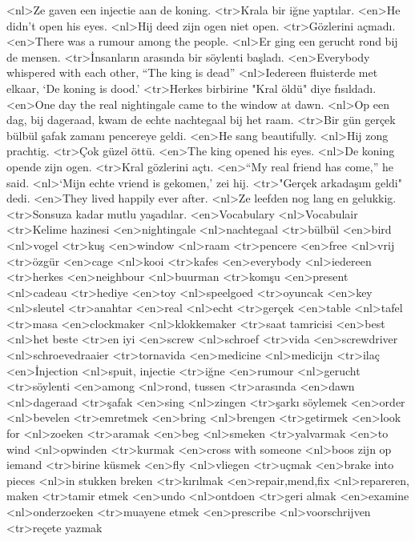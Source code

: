 <nl>Ze gaven een injectie aan de koning.
<tr>Krala bir iğne yaptılar.
<en>He didn’t open his eyes.
<nl>Hij deed zijn ogen niet open.
<tr>Gözlerini açmadı.
<en>There was a rumour among the people.
<nl>Er ging een gerucht rond bij de mensen.
<tr>İnsanların arasında bir söylenti başladı.
<en>Everybody whispered with each other, “The king is dead”
<nl>Iedereen fluisterde met elkaar, `De koning is dood.'
<tr>Herkes birbirine "Kral öldü" diye fısıldadı.
<en>One day the real nightingale came to the window at dawn.
<nl>Op een dag, bij dageraad,  kwam de echte nachtegaal bij het raam.
<tr>Bir gün gerçek bülbül şafak zamanı pencereye geldi.
<en>He sang beautifully.
<nl>Hij zong prachtig.
<tr>Çok güzel öttü.
<en>The king opened his eyes.
<nl>De koning opende zijn ogen.
<tr>Kral gözlerini açtı.
<en>“My real friend has  come,” he said.
<nl>`Mijn echte vriend is gekomen,' zei hij.
<tr>"Gerçek arkadaşım geldi" dedi.
<en>They lived happily ever after.
<nl>Ze leefden nog lang en gelukkig.
<tr>Sonsuza kadar mutlu yaşadılar.
<en>Vocabulary
<nl>Vocabulair
<tr>Kelime hazinesi
<en>nightingale
<nl>nachtegaal
<tr>bülbül
<en>bird
<nl>vogel
<tr>kuş
<en>window
<nl>raam
<tr>pencere
<en>free
<nl>vrij
<tr>özgür
<en>cage
<nl>kooi
<tr>kafes
<en>everybody
<nl>iedereen
<tr>herkes
<en>neighbour
<nl>buurman
<tr>komşu
<en>present
<nl>cadeau
<tr>hediye
<en>toy
<nl>speelgoed
<tr>oyuncak
<en>key
<nl>sleutel
<tr>anahtar
<en>real
<nl>echt
<tr>gerçek
<en>table
<nl>tafel
<tr>masa
<en>clockmaker
<nl>klokkemaker
<tr>saat tamricisi
<en>best
<nl>het beste
<tr>en iyi
<en>screw
<nl>schroef
<tr>vida
<en>screwdriver
<nl>schroevedraaier
<tr>tornavida
<en>medicine
<nl>medicijn
<tr>ilaç
<en>İnjection
<nl>spuit, injectie
<tr>iğne
<en>rumour
<nl>gerucht
<tr>söylenti
<en>among
<nl>rond, tussen
<tr>arasında
<en>dawn
<nl>dageraad
<tr>şafak
<en>sing
<nl>zingen
<tr>şarkı söylemek
<en>order
<nl>bevelen
<tr>emretmek
<en>bring
<nl>brengen
<tr>getirmek
<en>look for
<nl>zoeken
<tr>aramak
<en>beg
<nl>smeken
<tr>yalvarmak
<en>to wind
<nl>opwinden
<tr>kurmak
<en>cross with someone
<nl>boos zijn op iemand
<tr>birine küsmek
<en>fly
<nl>vliegen
<tr>uçmak
<en>brake into pieces
<nl>in stukken breken
<tr>kırılmak
<en>repair,mend,fix
<nl>repareren, maken
<tr>tamir etmek
<en>undo
<nl>ontdoen 
<tr>geri almak
<en>examine
<nl>onderzoeken
<tr>muayene etmek
<en>prescribe
<nl>voorschrijven
<tr>reçete yazmak
